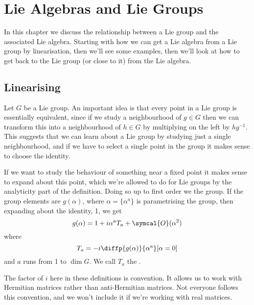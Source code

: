 \documentclass[fleqn]{NotesClass}
\newcommand{\order}{\symcal{O}}
\begin{document}
    \chapter{Lie Algebras and Lie Groups}
    In this chapter we discuss the relationship between a Lie group and the associated Lie algebra.
    Starting with how we can get a Lie algebra from a Lie group by linearisation, then we'll see some examples, then we'll look at how to get back to the Lie group (or close to it) from the Lie algebra.
    
    \section{Linearising}
    Let \(G\) be a Lie group.
    An important idea is that every point in a Lie group is essentially equivalent, since if we study a neighbourhood of \(g \in G\) then we can transform this into a neighbourhood of \(h \in G\) by multiplying on the left by \(hg^{-1}\).
    This suggests that we can learn about a Lie group by studying just a single neighbourhood, and if we have to select a single point in the group it makes sense to choose the identity.
    
    If we want to study the behaviour of something near a fixed point it makes sense to expand about this point, which we're allowed to do for Lie groups by the analyticity part of the definition.
    Doing so up to first order we  the group.
    If the group elements are \(g(\alpha)\), where \(\alpha = \{\alpha^a\}\) is parametrising the group, then expanding about the identity, 1, we get
    \begin{equation}
        g(\alpha) = 1 + i\alpha^a T_a + \order(\alpha^2)
    \end{equation}
    where
    \begin{equation}
        T_a = -i \diffp{g(\alpha)}{\alpha^a}[\alpha = 0]
    \end{equation}
    and \(a\) runs from 1 to \(\dim G\).
    We call \(T_a\) the .
    \begin{wrn}
        The factor of \(i\) here in these definitions is convention.
        It allows us to work with Hermitian matrices rather than anti-Hermitian matrices.
        Not everyone follows this convention, and we won't include it if we're working with real matrices.
    \end{wrn}
    
\end{document}
